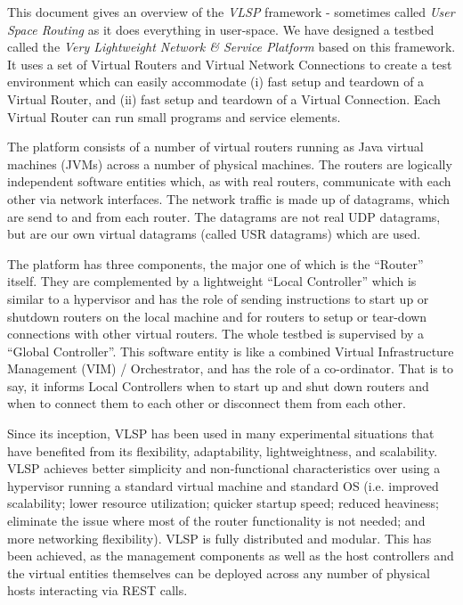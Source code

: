 This document gives an overview of the \emph{VLSP}
framework - sometimes called  \emph{User Space Routing} as it does
everything in user-space.
We have designed a  testbed called
the \emph{Very Lightweight Network \& Service Platform} based on this framework.
It uses a set of Virtual Routers and Virtual Network Connections to
create a test  environment which can easily accommodate
 (i) fast setup and teardown of a Virtual Router,
and (ii) fast setup and teardown of a Virtual Connection.
Each Virtual Router can run small programs and service elements. 

The platform consists of a number of virtual routers running
as Java virtual machines (JVMs) across a  number of physical machines.
The routers are logically independent software entities which, as with
real routers, communicate with each other via network
interfaces.  The network traffic is made up of datagrams, which are
send to and from each router. The datagrams are not real UDP
datagrams, but are our own virtual datagrams (called USR datagrams) which are
used.

The platform has three components, the major one of 
which is the ``Router'' itself.  They are complemented by a
lightweight ``Local Controller'' which is similar to a hypervisor and has the role of sending instructions to start up 
or shutdown routers on the local machine and for routers to setup or
tear-down connections with other virtual routers.  The whole testbed
is supervised by a ``Global Controller''.  
This software entity is like a combined Virtual Infrastructure Management (VIM) / Orchestrator,
and has the role of a
co-ordinator.  That is to say, it informs 
Local Controllers when to start up and shut down routers and when to 
connect them to each other or disconnect them from each other.


Since its inception, VLSP has been used in many experimental
situations that have benefited from its flexibility, adaptability,
lightweightness, and scalability.
VLSP achieves better simplicity and non-functional characteristics
over using a hypervisor running a standard virtual machine and
standard OS (i.e. improved scalability; lower resource utilization;
quicker startup speed; reduced heaviness; eliminate the issue where
most of the router functionality is not needed; and more networking
flexibility).  VLSP is fully distributed and modular. This has
been achieved, as the management components as well as the host
controllers and the virtual entities themselves can be deployed across
any number of physical hosts interacting via REST calls.


